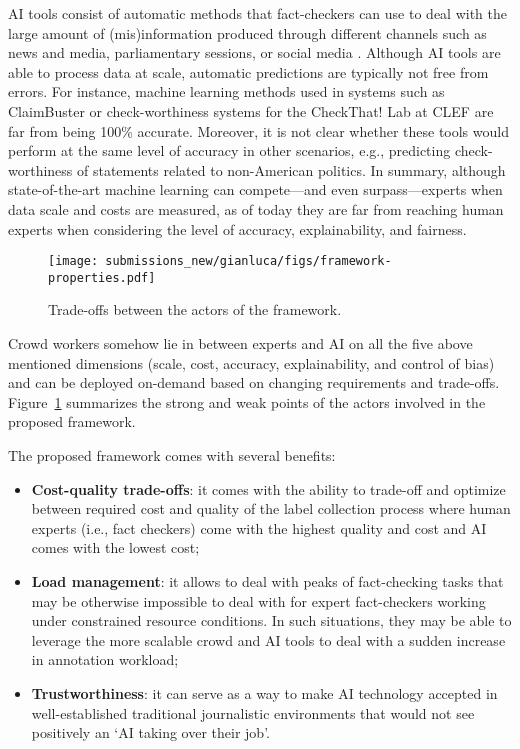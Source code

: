 \documentclass[11pt]{article}
\begin{document}
AI tools consist of automatic methods that fact-checkers can use to deal with the large amount of (mis)information produced through different channels such as news and media, parliamentary sessions, or social media \cite{cerone2020wnc}. Although AI tools are able to process data at  scale, automatic predictions are typically not free from errors. For instance, machine learning methods used in systems such as ClaimBuster \cite{claimbuster} or check-worthiness systems for the CheckThat! Lab at CLEF \cite{checkthat} are far from being 100\% accurate.
Moreover, it is not clear whether these tools would perform at the same level of accuracy in other scenarios, e.g., predicting check-worthiness of statements related to non-American politics.
%
In summary, although state-of-the-art machine learning can compete---and even  surpass---experts when data scale and costs are measured, as of today they are far from reaching human experts when considering the level of accuracy, explainability, and fairness.
%
\begin{figure}[tb]
    \centering
    \texttt{[image: submissions\_new/gianluca/figs/framework-properties.pdf]}
    \caption{Trade-offs between the actors of the framework.}
    \label{fig:framework-properties}
\end{figure}

Crowd workers somehow lie in between experts and AI on all the five above mentioned dimensions (scale, cost, accuracy, explainability, and control of bias) and can be deployed on-demand based on changing requirements and trade-offs. Figure~\ref{fig:framework-properties} summarizes the strong and weak points of the actors involved in the proposed framework.

The proposed framework comes with several benefits:
\begin{itemize}
    \item \textbf{Cost-quality trade-offs}: it comes with the ability to trade-off and optimize between required cost and quality of the label collection process where human experts (i.e., fact checkers) come with the highest quality and cost and AI comes with the lowest cost;
    \item \textbf{Load management}: it allows to deal with peaks of fact-checking tasks that may be otherwise impossible to deal with for expert fact-checkers working under constrained resource conditions. In such situations, they may be able to leverage the more scalable crowd and AI tools to deal with a sudden increase in annotation workload;
    \item \textbf{Trustworthiness}: it can serve as a way to make AI technology accepted in well-established traditional journalistic environments that would not see positively an `AI taking over their job'.
\end{itemize}
\end{document}
